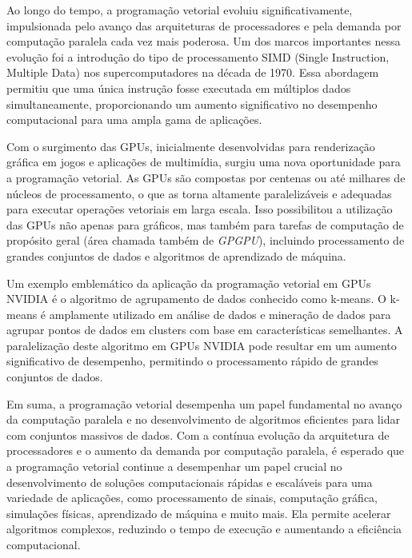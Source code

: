 \documentclass[12pt,
openright, 
oneside, %
a4paper,    %
brazil]{facom-ufu-abntex2}
\begin{document}
Ao longo do tempo, a programação vetorial evoluiu significativamente, impulsionada pelo avanço das arquiteturas de processadores e pela demanda por computação paralela cada vez mais poderosa. Um dos marcos importantes nessa evolução foi a introdução do tipo de processamento SIMD (Single Instruction, Multiple Data) nos supercomputadores na década de 1970. Essa abordagem permitiu que uma única instrução fosse executada em múltiplos dados simultaneamente, proporcionando um aumento significativo no desempenho computacional para uma ampla gama de aplicações.

Com o surgimento das GPUs, inicialmente desenvolvidas para renderização gráfica em jogos e aplicações de multimídia, surgiu uma nova oportunidade para a programação vetorial. As GPUs são compostas por centenas ou até milhares de núcleos de processamento, o que as torna altamente paralelizáveis e adequadas para executar operações vetoriais em larga escala. Isso possibilitou a utilização das GPUs não apenas para gráficos, mas também para tarefas de computação de propósito geral (área chamada também de \textit{GPGPU}), incluindo processamento de grandes conjuntos de dados e algoritmos de aprendizado de máquina.

Um exemplo emblemático da aplicação da programação vetorial em GPUs NVIDIA é o algoritmo de agrupamento de dados conhecido como k-means. O k-means é amplamente utilizado em análise de dados e mineração de dados para agrupar pontos de dados em clusters com base em características semelhantes. A paralelização deste algoritmo em GPUs NVIDIA pode resultar em um aumento significativo de desempenho, permitindo o processamento rápido de grandes conjuntos de dados.

Em suma, a programação vetorial desempenha um papel fundamental no avanço da computação paralela e no desenvolvimento de algoritmos eficientes para lidar com conjuntos massivos de dados. Com a contínua evolução da arquitetura de processadores e o aumento da demanda por computação paralela, é esperado que a programação vetorial continue a desempenhar um papel crucial no desenvolvimento de soluções computacionais rápidas e escaláveis para uma variedade de aplicações, como processamento de sinais, computação gráfica, simulações físicas, aprendizado de máquina e muito mais. Ela permite acelerar algoritmos complexos, reduzindo o tempo de execução e aumentando a eficiência computacional.

\end{document}
